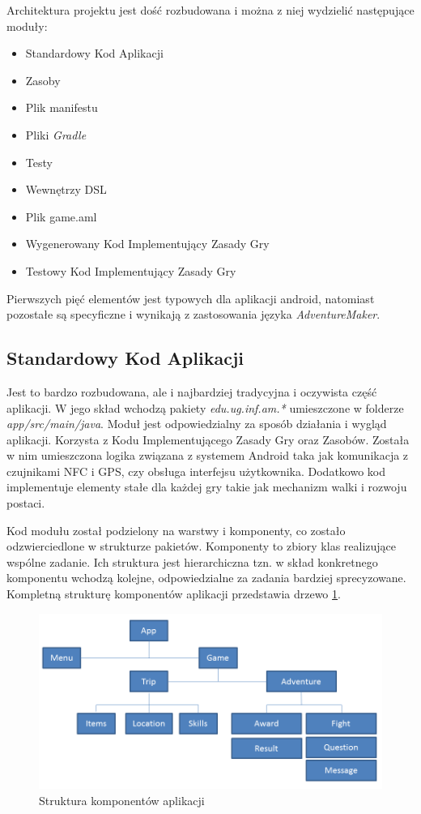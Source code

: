 \documentclass[openright]{xmgr}
\begin{document}
Architektura projektu jest dość rozbudowana i można z niej wydzielić następujące moduły:

\begin{itemize}
	\item Standardowy Kod Aplikacji
	\item Zasoby
	\item Plik manifestu
	\item Pliki \textit{Gradle}
	\item Testy
	\item Wewnętrzy DSL
	\item Plik game.aml
	\item Wygenerowany Kod Implementujący Zasady Gry
	\item Testowy Kod Implementujący Zasady Gry
\end{itemize}

Pierwszych pięć elementów jest typowych dla aplikacji android, natomiast pozostałe są specyficzne i wynikają z zastosowania języka \textit{AdventureMaker}.

\subsection*{Standardowy Kod Aplikacji} 

Jest to bardzo rozbudowana, ale i najbardziej tradycyjna i oczywista część aplikacji. W jego skład wchodzą pakiety \textit{edu.ug.inf.am.*} umieszczone w folderze \textit{app/src/main/java}. Moduł jest odpowiedzialny za sposób działania i wygląd aplikacji. Korzysta z Kodu Implementującego Zasady Gry oraz Zasobów. Została w nim umieszczona logika związana z systemem Android taka jak komunikacja z czujnikami NFC i GPS, czy obsługa interfejsu użytkownika. Dodatkowo kod implementuje elementy stałe dla każdej gry takie jak mechanizm walki i rozwoju postaci.

Kod modułu został podzielony na warstwy i komponenty, co zostało odzwierciedlone w strukturze pakietów. 
Komponenty to zbiory klas realizujące wspólne zadanie. Ich struktura jest hierarchiczna tzn. w skład konkretnego komponentu wchodzą kolejne, odpowiedzialne za zadania bardziej sprecyzowane. Kompletną strukturę komponentów aplikacji przedstawia drzewo \ref{modules:tree}.

\begin{figure}[!tbh]
	\centering
	\includegraphics[width=1.0\hsize]{fig/modules_tree}
	\caption{Struktura komponentów aplikacji}
	\label{modules:tree}
\end{figure}
\end{document}
